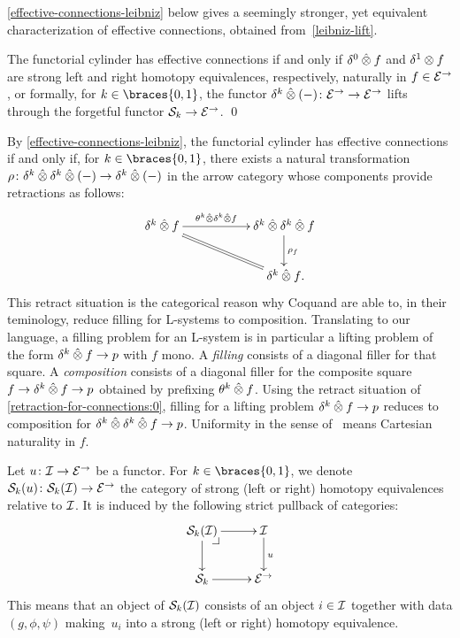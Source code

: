 \documentclass[reqno,10pt,a4paper,oneside,draft]{amsart}
\begin{document}
\cref{effective-connections-leibniz} below gives a seemingly stronger, yet equivalent characterization of effective connections,
obtained from~\cref{leibniz-lift}.

\begin{corollary} \label{effective-connections-leibniz}
The functorial cylinder has effective connections if and only if $\lcyl \hatotimes f$ and $\rcyl \otimes f$ are strong left and right homotopy equivalences, respectively, naturally in $f \in \catE^\to$, or formally, for $k \in \braces{0, 1}$, the functor $\kcyl \hatotimes (-) \co \catE^\to \to \catE^\to$ lifts through the forgetful functor $\cal{S}_k \to \catE^\to$. \qed
\end{corollary}

\begin{remark} \label{retraction-for-connections}
By \cref{effective-connections-leibniz}, the functorial cylinder has effective connections if and only if, for $k \in \braces{0, 1}$, there exists a natural transformation $\rho \co \kcyl \hatotimes \kcyl \hatotimes (-) \to \kcyl \hatotimes (-)$ in the arrow category whose components provide retractions as follows:
\begin{equation} \label{retraction-for-connections:0}
\xymatrix@C+3em{
  \kcyl \hatotimes f
  \ar[r]^-{\thetak \hatotimes \kcyl \hatotimes f}
  \ar@{=}[dr]
&
  \kcyl \hatotimes \kcyl \hatotimes f
  \ar[d]^{\rho_f}
\\&
  \kcyl \hatotimes f
\rlap{.}}
\end{equation}
This retract situation is the categorical reason why Coquand \etal\cite{coquand-variation} are able to, in their teminology, reduce filling for L-systems to composition.
Translating to our language, a filling problem for an L-system is in particular a lifting problem of the form $\kcyl \hatotimes f \to p$ with $f$ mono.
A \emph{filling} consists of a diagonal filler for that square.
A \emph{composition} consists of a diagonal filler for the composite square $f \to \kcyl \hatotimes f \to p$ obtained by prefixing $\theta^k \hatotimes f$.
Using the retract situation of \eqref{retraction-for-connections:0}, filling for a lifting problem $\kcyl \hatotimes f \to p$ reduces to composition for $\kcyl \hatotimes \kcyl \hatotimes f \to p$.
Uniformity in the sense of~\cite{coquand-variation} means Cartesian naturality in $f$.
\end{remark}

Let  $u \co \cal{I} \to \catE^\to$ be a functor.
For $k \in \braces{0, 1}$, we denote $\cal{S}_k(u) \co \cal{S}_k(\cal{I}) \to \catE^\to$ the category of strong (left or right) homotopy equivalences relative to $\cal{I}$.
It is induced by the following strict pullback of categories:
\[
\xymatrix{
  \cal{S}_k(\cal{I})
  \ar[r]
  \ar[d]
  \pullback{dr}
&
  \cal{I}
  \ar[d]^{u}
\\
  \cal{S}_k
  \ar[r]
&
  \catE^\to
}
\]
This means that an object of $\cal{S}_k(\cal{I})$ consists of an object $i \in \cal{I}$ together with data $(g, \phi, \psi)$ making~$u_i$ into a strong (left or right) homotopy equivalence.
\end{document}
